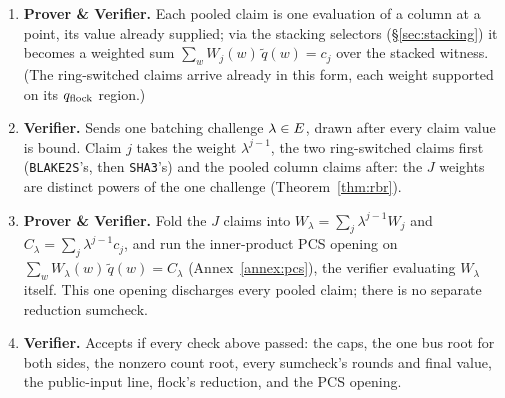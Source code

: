 \begin{enumerate}
\item \textbf{Prover \& Verifier.} Each pooled claim is one evaluation of a column at a point, its value already supplied; via the stacking selectors (\S\ref{sec:stacking}) it becomes a weighted sum $\sum_w W_j(w)\,\widetilde q(w)=c_j$ over the stacked witness. (The ring-switched claims arrive already in this form, each weight supported on its $q_{\mathrm{flock}}$ region.)
\item \textbf{Verifier.} Sends one batching challenge $\lambda\in E$, drawn after every claim value is bound. Claim $j$ takes the weight $\lambda^{j-1}$, the two ring-switched claims first (\texttt{BLAKE2S}'s, then \texttt{SHA3}'s) and the pooled column claims after: the $J$ weights are distinct powers of the one challenge (Theorem~\ref{thm:rbr}).
\item \textbf{Prover \& Verifier.} Fold the $J$ claims into $W_\lambda=\sum_j\lambda^{j-1} W_j$ and $C_\lambda=\sum_j\lambda^{j-1} c_j$, and run the inner-product PCS opening on $\sum_w W_\lambda(w)\,\widetilde q(w)=C_\lambda$ (Annex~\ref{annex:pcs}), the verifier evaluating $W_\lambda$ itself. This one opening discharges every pooled claim; there is no separate reduction sumcheck.
\item \textbf{Verifier.} Accepts if every check above passed: the caps, the one bus root for both sides, the nonzero count root, every sumcheck's rounds and final value, the public-input line, flock's reduction, and the PCS opening.
\end{enumerate}
